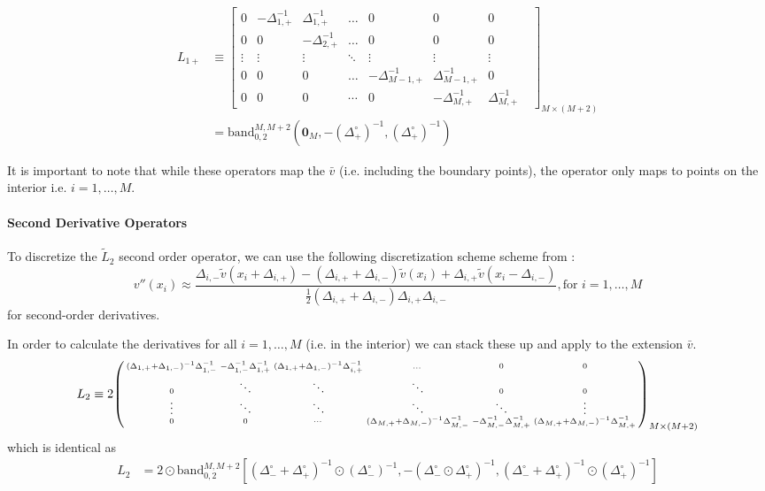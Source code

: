 \documentclass[11pt]{article}
\newcommand{\band}{\ensuremath{\mathrm{band}}}
\newenvironment{psmallmatrix}
{\left(\begin{smallmatrix}}
	{\end{smallmatrix}\right)}
\theoremstyle{definition}
\begin{document}
\begin{align}\label{eq:L-1-plus-extended}
{L}_{1+} &\equiv \begin{bmatrix}
0&-\Delta_{1,+}^{-1}&\Delta_{1,+}^{-1}&\dots&0&0&0\\
0&0&-\Delta_{2,+}^{-1}&\dots&0&0&0\\
\vdots&\vdots&\vdots&\ddots&\vdots&\vdots&\vdots\\
0&0&0&\dots&-\Delta_{M-1,+}^{-1}&\Delta_{M-1,+}^{-1}&0\\
0&0&0&\cdots&0&-\Delta_{M,+}^{-1}&\Delta_{M,+}^{-1}&
\end{bmatrix}_{M\times (M+2)} \\
&= 
\band^{M,M+2}_{0,2}(\mathbf{0}_M, -(\Delta_+^\circ)^{-1}, (\Delta_+^\circ)^{-1})
\end{align}

It is important to note that while these operators map the $\bar{v}$ (i.e. including the boundary points), the operator only maps to points on the interior i.e. $i = 1, \ldots, M$.



\paragraph{Second Derivative Operators}
To discretize the $\tilde{L}_2$ second order operator, we can use the following discretization scheme scheme from \cite{achdou17}:
\begin{equation}
v''(x_i) \approx \dfrac{ \Delta_{i,-} \tilde{v}( x_i + \Delta_{i,+}) - (\Delta_{i,+} + \Delta_{i,-}) \tilde{v}( x_i ) + \Delta_{i,+} \tilde{v}( x_i - \Delta_{i,-})}{\frac{1}{2}(\Delta_{i,+} + \Delta_{i,-}) \Delta_{i,+} \Delta_{i,-} }, \text{for } i = 1, \ldots, M
\end{equation}
for second-order derivatives.


In order to calculate the derivatives for all $i = 1, \ldots, M$ (i.e. in the interior) we can stack these up and apply to the extension $\bar{v}$.
\begin{align}\label{eq:L-2-extended} \small
{L}_2 \equiv 2 \begin{psmallmatrix}
(\Delta_{1,+}+\Delta_{1,-})^{-1}\Delta_{1,-}^{-1} &-\Delta_{1,-}^{-1} \Delta_{1,+}^{-1}  & (\Delta_{1,+}+\Delta_{1,-})^{-1} \Delta_{i,+}^{-1}&\dots&0&0\\
0 & \ddots & \ddots &\ddots & 0 & 0\\
\vdots&\ddots &\ddots & \ddots & \ddots & \vdots\\
0&0&\cdots&
(\Delta_{M,+}+\Delta_{M,-})^{-1}\Delta_{M,-}^{-1} &-\Delta_{M,-}^{-1} \Delta_{M,+}^{-1}  &
(\Delta_{M,+}+\Delta_{M,-})^{-1}\Delta_{M,+}^{-1}
\end{psmallmatrix}_{M\times (M+2)} 
\end{align}
which is identical as
\begin{align}
L_2 &= 2 \odot \band_{0,2}^{M,M+2} \left[(\Delta_-^\circ + \Delta_+^\circ)^{-1} \odot (\Delta_{-}^\circ)^{-1}, -(\Delta_-^\circ \odot \Delta_+^\circ)^{-1} , (\Delta_-^\circ + \Delta_+^\circ)^{-1} \odot (\Delta_{+}^\circ)^{-1} \right]
\end{align}
\end{document}
